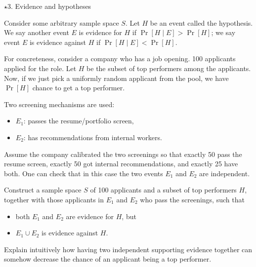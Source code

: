 \documentclass[12pt]{article}
\begin{document}
\newpage

\begin{problem}{$\star$3. Evidence and hypotheses}

Consider some arbitrary sample space $S$. Let $H$ be an event called the hypothesis. We say another event $E$ is evidence for $H$ if $\Pr[H \mid E] > \Pr[H]$; we say event $E$ is evidence against $H$ if $\Pr[H \mid E] < \Pr[H]$.

For concreteness, consider a company who has a job opening. 100 applicants applied for the role. Let $H$ be the subset of top performers among the applicants. Now, if we just pick a uniformly random applicant from the pool, we have $\Pr[H]$ chance to get a top performer.

Two screening mechanisms are used:
\begin{itemize}
    \item $E_1$: passes the resume/portfolio screen,
    \item $E_2$: has recommendations from internal workers.
\end{itemize}

Assume the company calibrated the two screenings so that exactly 50 pass the resume screen, exactly 50 got internal recommendations, and exactly 25 have both. One can check that in this case the two events $E_1$ and $E_2$ are independent.

Construct a sample space $S$ of 100 applicants and a subset of top performers $H$, together with those applicants in $E_1$ and $E_2$ who pass the screenings, such that
\begin{itemize}
    \item both $E_1$ and $E_2$ are evidence for $H$, but
    \item $E_1 \cup E_2$ is evidence against $H$.
\end{itemize}

Explain intuitively how having two independent supporting evidence together can somehow decrease the chance of an applicant being a top performer.
\end{problem}

\begin{solution}
    \bbni
    

\end{solution}
\end{document}
